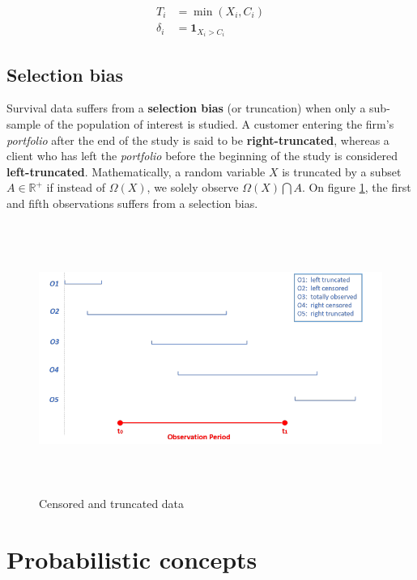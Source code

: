 \documentclass[
]{book}
\begin{document}
\begin{equation}
  \begin{aligned}
  T_i & = \min(X_i, C_i) \\
  \delta_i & = \pmb{1}_{X_i > C_i}
  \end{aligned}
  \label{eq:censoring}
\end{equation}

\hypertarget{selection-bias}{%
\subsection{Selection bias}\label{selection-bias}}

Survival data suffers from a \textbf{selection bias} (or truncation) when only a sub-sample of the population of interest is studied. A customer entering the firm's \emph{portfolio} after the end of the study is said to be \textbf{right-truncated}, whereas a client who has left the \emph{portfolio} before the beginning of the study is considered \textbf{left-truncated}. Mathematically, a random variable \(X\) is truncated by a subset \(A \in \mathbb{R}^+\) if instead of \(\Omega(X)\), we solely observe \(\Omega(X)\bigcap A\). On figure \ref{fig:censoring}, the first and fifth observations suffers from a selection bias.

\begin{figure}

{\centering \includegraphics[width=500pt,height=250pt]{./imgs/censoring_and_truncation} 

}

\caption{Censored and truncated data}\label{fig:censoring}
\end{figure}

\hypertarget{probabilistic-concepts}{%
\section{Probabilistic concepts}\label{probabilistic-concepts}}
\end{document}
